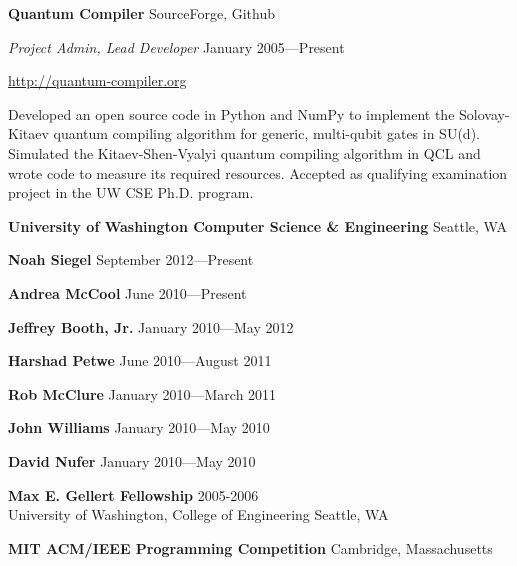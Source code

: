 \documentclass[letter]{article}
\begin{document}
\vspace{\baselineskip}
\par
{\bf {Quantum Compiler}} \hfill SourceForge, Github
\par
{\em Project Admin, Lead Developer} \hfill January 2005---Present
\par
\url{http://quantum-compiler.org}
\par
Developed an open source code in Python and NumPy to implement the
Solovay-Kitaev quantum compiling algorithm for generic, multi-qubit gates
in SU(d). Simulated the Kitaev-Shen-Vyalyi quantum compiling algorithm in
QCL and wrote code to measure its required resources. Accepted as
qualifying examination project in the UW CSE Ph.D. program.

\vspace{\baselineskip}
\par
{\bf {University of Washington Computer Science \& Engineering}} \hfill Seattle, WA
\par
{\bf Noah Siegel} \hfill September 2012---Present
\par
{\bf Andrea McCool} \hfill June 2010---Present
\par
{\bf Jeffrey Booth, Jr.} \hfill January 2010---May 2012
\par
{\bf Harshad Petwe} \hfill June 2010---August 2011
\par
{\bf Rob McClure} \hfill January 2010---March 2011
\par
{\bf John Williams} \hfill January 2010---May 2010
\par
{\bf David Nufer} \hfill January 2010---May 2010

\vspace{\baselineskip}
\par
{\bf {Max E. Gellert Fellowship}} \hfill 2005-2006\\
University of Washington, College of Engineering \hfill Seattle, WA

\par

\vspace{\baselineskip}

{\bf MIT ACM/IEEE Programming Competition} \hfill Cambridge, Massachusetts
\end{document}

